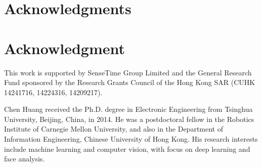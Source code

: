 \documentclass[10pt,journal,compsoc]{IEEEtran}
\begin{document}
\ifCLASSOPTIONcompsoc
  \section*{Acknowledgments}
\else
  \section*{Acknowledgment}
\fi


This work is supported by SenseTime Group Limited and the General Research Fund sponsored by the Research Grants Council of the Hong Kong SAR (CUHK 14241716, 14224316, 14209217). 


\ifCLASSOPTIONcaptionsoff
  \newpage
\fi







% 

\begin{IEEEbiography}{Chen Huang}
received the Ph.D. degree in Electronic Engineering from Tsinghua University, Beijing, China, in 2014. He was a postdoctoral fellow in the Robotics Institute of Carnegie Mellon University, and also in the Department of Information Engineering, Chinese University of Hong Kong. His research interests include machine learning and computer vision, with focus on deep learning and face analysis.
\end{IEEEbiography}
\end{document}
